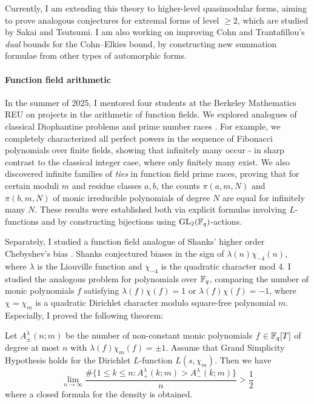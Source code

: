 \documentclass[letterpaper, 10pt]{article}
\begin{document}
Currently, I am extending this theory to higher-level quasimodular forms, aiming to prove analogous conjectures for extremal forms of level $\ge 2$, which are studied by Sakai and Tsutsumi.
I am also working on improving Cohn and Trantafillou's \emph{dual} bounds for the Cohn--Elkies bound, by constructing new summation formulae from other types of automorphic forms.


\paragraph{Function field arithmetic}

In the summer of 2025, I mentored four students at the Berkeley Mathematics REU on projects in the arithmetic of function fields. We explored analogues of classical Diophantine problems and prime number races \cite{bjlls2025fibonacci,bjlls2025tie}.
For example, we completely characterized all perfect powers in the sequence of Fibonacci polynomials over finite fields, showing that infinitely many occur - in sharp contrast to the classical integer case, where only finitely many exist.
We also discovered infinite families of \emph{ties} in function field prime races, proving that for certain moduli $m$ and residue classes $a, b$, the counts $\pi(a, m, N)$ and $\pi(b, m, N)$ of monic irreducible polynomials of degree $N$ are equal for infinitely many $N$.
These results were established both via explicit formulas involving $L$-functions and by constructing bijections using $\mathrm{GL}_2(\mathbb{F}_q)$-actions.

Separately, I studied a function field analogue of Shanks' higher order Chebyshev's bias \cite{lee2025shanks}.
Shanks conjectured biases in the sign of $\lambda(n)\chi_{-4}(n)$, where $\lambda$ is the Liouville function and $\chi_{-4}$ is the quadratic character mod 4.
I studied the analogous problem for polynomials over $\mathbb{F}_q$, comparing the number of monic polynomials \(f\) satisfying \(\lambda(f) \chi(f) = 1\) or \(\lambda(f) \chi(f) = -1\), where \(\chi = \chi_m\) is a quadratic Dirichlet character modulo square-free polynomial \(m\).
Especially, I proved the following theorem:


\begin{theorem*}
    Let \(A_{\pm}^\lambda(n;m)\) be the number of non-constant monic polynomials \(f \in \mathbb{F}_q[T]\) of degree at most \(n\) with \(\lambda(f) \chi_m(f) = \pm 1\).
    Assume that Grand Simplicity Hypothesis holds for the Dirichlet \(L\)-function \(L(s, \chi_m)\).
    Then we have
    \[
    \lim_{n \to \infty} \frac{\#\{1 \le k \le n : A_{+}^\lambda(k;m) > A_{-}^\lambda(k;m)\}}{n} > \frac{1}{2}
    \]
    where a closed formula for the density is obtained.
\end{theorem*}
\end{document}
